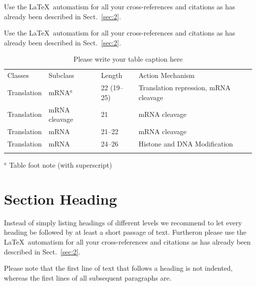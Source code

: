  Use the \LaTeX\ automatism for all your cross-refer\-ences and citations as has already been described in Sect.~\ref{sec:2}.

 Use the \LaTeX\ automatism for all your cross-refer\-ences and citations as has already been described in Sect.~\ref{sec:2}.
%
%
\begin{table}[!t]
    \caption{Please write your table caption here}
    \label{tab:1}       %
    \begin{tabular}{p{2cm}p{2.4cm}p{2cm}p{4.9cm}}
        \hline\noalign{\smallskip}
        Classes     & Subclass      & Length      & Action Mechanism                      \\
        \noalign{\smallskip}\svhline\noalign{\smallskip}
        Translation & mRNA$^a$      & 22 (19--25) & Translation repression, mRNA cleavage \\
        Translation & mRNA cleavage & 21          & mRNA cleavage                         \\
        Translation & mRNA          & 21--22      & mRNA cleavage                         \\
        Translation & mRNA          & 24--26      & Histone and DNA Modification          \\
        \noalign{\smallskip}\hline\noalign{\smallskip}
    \end{tabular}
    $^a$ Table foot note (with superscript)
\end{table}
%
\section{Section Heading}
\label{sec:3}
Instead of simply listing headings of different levels we recommend to let every heading be followed by at least a short passage of text. Furtheron please use the \LaTeX\ automatism for all your cross-references and citations as has already been described in Sect.~\ref{sec:2}.

Please note that the first line of text that follows a heading is not indented, whereas the first lines of all subsequent paragraphs are.

